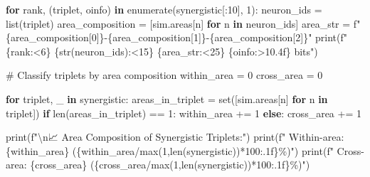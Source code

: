 \documentclass[
  11pt,
  letterpaper,
  oneside,
  openany]{book}
\newenvironment{Shaded}{\begin{snugshade}}{\end{snugshade}}
\newcommand{\BuiltInTok}[1]{\textcolor[rgb]{0.00,0.23,0.31}{#1}}
\newcommand{\CharTok}[1]{\textcolor[rgb]{0.13,0.47,0.30}{#1}}
\newcommand{\CommentTok}[1]{\textcolor[rgb]{0.37,0.37,0.37}{#1}}
\newcommand{\ControlFlowTok}[1]{\textcolor[rgb]{0.00,0.23,0.31}{\textbf{#1}}}
\newcommand{\DecValTok}[1]{\textcolor[rgb]{0.68,0.00,0.00}{#1}}
\newcommand{\KeywordTok}[1]{\textcolor[rgb]{0.00,0.23,0.31}{\textbf{#1}}}
\newcommand{\NormalTok}[1]{\textcolor[rgb]{0.00,0.23,0.31}{#1}}
\newcommand{\OperatorTok}[1]{\textcolor[rgb]{0.37,0.37,0.37}{#1}}
\newcommand{\SpecialCharTok}[1]{\textcolor[rgb]{0.37,0.37,0.37}{#1}}
\newcommand{\SpecialStringTok}[1]{\textcolor[rgb]{0.13,0.47,0.30}{#1}}
\begin{document}
\begin{Shaded}
\begin{Highlighting}[]
\ControlFlowTok{for}\NormalTok{ rank, (triplet, oinfo) }\KeywordTok{in} \BuiltInTok{enumerate}\NormalTok{(synergistic[:}\DecValTok{10}\NormalTok{], }\DecValTok{1}\NormalTok{):}
\NormalTok{    neuron\_ids }\OperatorTok{=} \BuiltInTok{list}\NormalTok{(triplet)}
\NormalTok{    area\_composition }\OperatorTok{=}\NormalTok{ [sim.areas[n] }\ControlFlowTok{for}\NormalTok{ n }\KeywordTok{in}\NormalTok{ neuron\_ids]}
\NormalTok{    area\_str }\OperatorTok{=} \SpecialStringTok{f"}\SpecialCharTok{\{}\NormalTok{area\_composition[}\DecValTok{0}\NormalTok{]}\SpecialCharTok{\}}\SpecialStringTok{{-}}\SpecialCharTok{\{}\NormalTok{area\_composition[}\DecValTok{1}\NormalTok{]}\SpecialCharTok{\}}\SpecialStringTok{{-}}\SpecialCharTok{\{}\NormalTok{area\_composition[}\DecValTok{2}\NormalTok{]}\SpecialCharTok{\}}\SpecialStringTok{"}
    \BuiltInTok{print}\NormalTok{(}\SpecialStringTok{f"}\SpecialCharTok{\{}\NormalTok{rank}\SpecialCharTok{:\textless{}6\}}\SpecialStringTok{ }\SpecialCharTok{\{}\BuiltInTok{str}\NormalTok{(neuron\_ids)}\SpecialCharTok{:\textless{}15\}}\SpecialStringTok{ }\SpecialCharTok{\{}\NormalTok{area\_str}\SpecialCharTok{:\textless{}25\}}\SpecialStringTok{ }\SpecialCharTok{\{}\NormalTok{oinfo}\SpecialCharTok{:\textgreater{}10.4f\}}\SpecialStringTok{ bits"}\NormalTok{)}

\CommentTok{\# Classify triplets by area composition}
\NormalTok{within\_area }\OperatorTok{=} \DecValTok{0}
\NormalTok{cross\_area }\OperatorTok{=} \DecValTok{0}

\ControlFlowTok{for}\NormalTok{ triplet, \_ }\KeywordTok{in}\NormalTok{ synergistic:}
\NormalTok{    areas\_in\_triplet }\OperatorTok{=} \BuiltInTok{set}\NormalTok{([sim.areas[n] }\ControlFlowTok{for}\NormalTok{ n }\KeywordTok{in}\NormalTok{ triplet])}
    \ControlFlowTok{if} \BuiltInTok{len}\NormalTok{(areas\_in\_triplet) }\OperatorTok{==} \DecValTok{1}\NormalTok{:}
\NormalTok{        within\_area }\OperatorTok{+=} \DecValTok{1}
    \ControlFlowTok{else}\NormalTok{:}
\NormalTok{        cross\_area }\OperatorTok{+=} \DecValTok{1}

\BuiltInTok{print}\NormalTok{(}\SpecialStringTok{f"}\CharTok{\textbackslash{}n}\SpecialStringTok{📈 Area Composition of Synergistic Triplets:"}\NormalTok{)}
\BuiltInTok{print}\NormalTok{(}\SpecialStringTok{f"  Within{-}area: }\SpecialCharTok{\{}\NormalTok{within\_area}\SpecialCharTok{\}}\SpecialStringTok{ (}\SpecialCharTok{\{}\NormalTok{within\_area}\OperatorTok{/}\BuiltInTok{max}\NormalTok{(}\DecValTok{1}\NormalTok{,}\BuiltInTok{len}\NormalTok{(synergistic))}\OperatorTok{*}\DecValTok{100}\SpecialCharTok{:.1f\}}\SpecialStringTok{\%)"}\NormalTok{)}
\BuiltInTok{print}\NormalTok{(}\SpecialStringTok{f"  Cross{-}area: }\SpecialCharTok{\{}\NormalTok{cross\_area}\SpecialCharTok{\}}\SpecialStringTok{ (}\SpecialCharTok{\{}\NormalTok{cross\_area}\OperatorTok{/}\BuiltInTok{max}\NormalTok{(}\DecValTok{1}\NormalTok{,}\BuiltInTok{len}\NormalTok{(synergistic))}\OperatorTok{*}\DecValTok{100}\SpecialCharTok{:.1f\}}\SpecialStringTok{\%)"}\NormalTok{)}
\end{Highlighting}
\end{Shaded}
\end{document}
